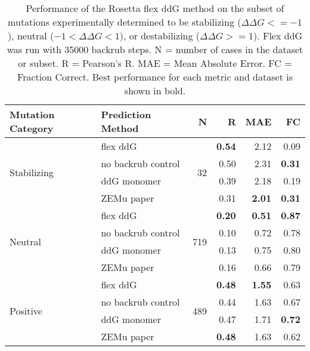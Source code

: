 \begin{table}
  \begin{tabular}{llrrrr}
\toprule
Mutation Category &   Prediction Method &    N &    R &  MAE &   FC \\
\midrule
 \multirow{ 4}{*}{Stabilizing} & flex ddG & \multirow{ 4}{*}{32} & \textbf{0.54} & 2.12 & 0.09  \\
 & no backrub control & & 0.50 & 2.31 & \textbf{0.31}  \\
 & ddG monomer & & 0.39 & 2.18 & 0.19  \\
 & ZEMu paper & & 0.31 & \textbf{2.01} & \textbf{0.31}  \\
\hline
 \multirow{ 4}{*}{Neutral} & flex ddG & \multirow{ 4}{*}{719} & \textbf{0.20} & \textbf{0.51} & \textbf{0.87}  \\
 & no backrub control & & 0.10 & 0.72 & 0.78  \\
 & ddG monomer & & 0.13 & 0.75 & 0.80  \\
 & ZEMu paper & & 0.16 & 0.66 & 0.79  \\
\hline
 \multirow{ 4}{*}{Positive} & flex ddG & \multirow{ 4}{*}{489} & \textbf{0.48} & \textbf{1.55} & 0.63  \\
 & no backrub control & & 0.44 & 1.63 & 0.67  \\
 & ddG monomer & & 0.47 & 1.71 & \textbf{0.72}  \\
 & ZEMu paper & & \textbf{0.48} & 1.63 & 0.62  \\
\bottomrule
\end{tabular}
  \caption[Flex ddG performance on stabilizing mutations]{
    Performance of the Rosetta flex ddG method on the subset of mutations experimentally determined to be stabilizing ($\Delta\Delta G <= -1$), neutral ($-1 < \Delta\Delta G < 1$), or destabilizing ($\Delta\Delta G >= 1$). Flex ddG was run with 35000 backrub steps. N = number of cases in the dataset or subset. R = Pearson's R. MAE = Mean Absolute Error. FC = Fraction Correct. Best performance for each metric and dataset is shown in bold.
  } \label{tab:table-stabilizing}
\end{table}
